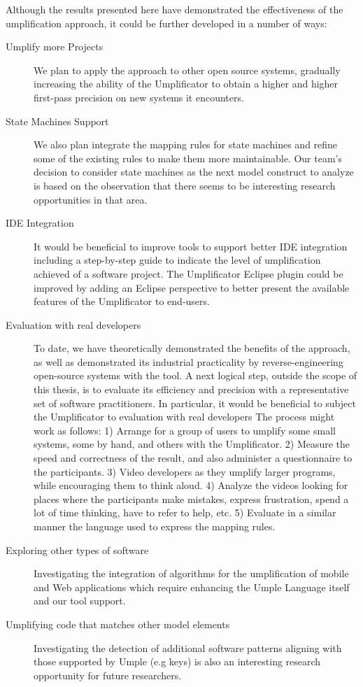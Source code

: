 Although the results presented here have demonstrated the effectiveness of the umplification approach, it could be further developed in a number of ways:

\begin{description}
\item[Umplify more Projects] We plan to apply the approach to other open source systems, gradually increasing the ability of the Umplificator to obtain a higher and higher first-pass precision on new systems it encounters.

\item[State Machines Support] We also plan integrate the mapping rules for state machines and refine some of the existing rules to make them more maintainable. Our team's decision to consider state machines as the next model construct to analyze is based on the observation that there seems to be interesting research opportunities in that area.

\item[IDE Integration] It would be beneficial to improve tools to support better IDE integration including a step-by-step guide to indicate the level of umplification achieved of a software project. The Umplificator Eclipse plugin could be improved by adding an Eclipse perspective to better present the available features of the Umplificator to end-users.

\item[Evaluation with real developers] To date, we have theoretically demonstrated the benefits of the approach, as well as demonstrated its industrial practicality by  reverse-engineering open-source systems with the tool.  A next logical step, outside the scope of this thesis, is to evaluate its efficiency and precision with a representative set of software practitioners.  In particular,  it would be beneficial to subject the Umplificator to evaluation with real developers The process might work as follows: 1) Arrange for a group of users to umplify some small systems, some by hand, and others with the Umplificator. 2) Measure the speed and correctness of the result, and also administer a questionnaire to the participants. 3) Video developers as they umplify larger programs, while  encouraging them to think aloud. 4) Analyze the videos looking for places where the participants make mistakes, express frustration, spend a lot of time thinking, have to refer to help, etc. 5) Evaluate in a similar manner the language used to express the mapping rules. 

\item[Exploring other types of software] Investigating the integration of algorithms for the umplification of mobile and Web applications which require enhancing the Umple Language itself and our tool support.

\item[Umplifying code that matches other model elements] Investigating the detection of additional software patterns aligning with those supported by Umple (e.g keys) is also an interesting research opportunity for future researchers.

\end{description}